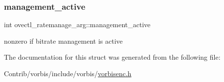 \subsubsection{\texorpdfstring{management\+\_\+active}{management\_active}}
{\footnotesize\ttfamily int ovectl\+\_\+ratemanage\+\_\+arg\+::management\+\_\+active}

nonzero if bitrate management is active 

The documentation for this struct was generated from the following file\+:\begin{DoxyCompactItemize}
\item 
Contrib/vorbis/include/vorbis/\mbox{\hyperlink{vorbisenc_8h}{vorbisenc.\+h}}\end{DoxyCompactItemize}
